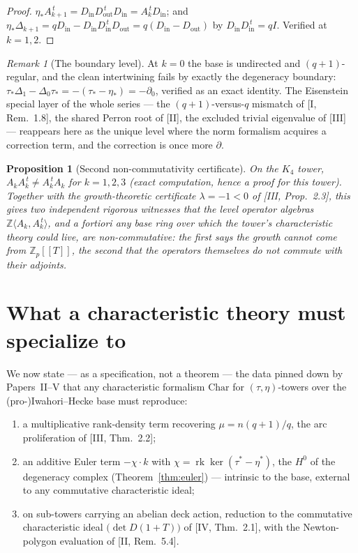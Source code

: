 \documentclass[11pt]{amsart}
\numberwithin{equation}{section}
\newtheorem{proposition}[theorem]{Proposition}
\theoremstyle{definition}
\theoremstyle{remark}
\newtheorem{remark}[theorem]{Remark}
\newcommand{\Z}{\mathbb{Z}}
\newcommand{\Zp}{\Z_p}
\newcommand{\rk}{\operatorname{rk}}
\newcommand{\ta}{\tau_*}
\newcommand{\taup}{\tau^*}
\newcommand{\et}{\eta_*}
\newcommand{\etp}{\eta^*}
\begin{document}
\begin{proof}
$\et A_{k+1}^{\,t}=D_{\mathrm{in}}D_{\mathrm{out}}^{\,t}D_{\mathrm{in}}
=A_k^{\,t}D_{\mathrm{in}}$; and
$\et\Delta_{k+1}=qD_{\mathrm{in}}-D_{\mathrm{in}}D_{\mathrm{in}}^{\,t}D_{\mathrm{out}}
=q(D_{\mathrm{in}}-D_{\mathrm{out}})$ by
$D_{\mathrm{in}}D_{\mathrm{in}}^{\,t}=qI$. Verified at $k=1,2$.
\end{proof}

\begin{remark}[The boundary level]\label{rem:level0}
At $k=0$ the base is undirected and $(q+1)$-regular, and the clean intertwining fails
by exactly the degeneracy boundary:
$\ta\Delta_1-\Delta_0\ta=-(\ta-\et)=-\partial_0$, verified as an exact identity. The
Eisenstein special layer of the whole series --- the $(q+1)$-versus-$q$ mismatch of
[I, Rem.~1.8], the shared Perron root of [II], the excluded trivial eigenvalue of
[III] --- reappears here as the unique level where the norm formalism acquires a
correction term, and the correction is once more $\partial$.
\end{remark}

\begin{proposition}[Second non-commutativity certificate]\label{prop:nonnormal}
On the $K_4$ tower, $A_kA_k^{\,t}\neq A_k^{\,t}A_k$ for $k=1,2,3$ (exact
computation, hence a proof for this tower). Together with the growth-theoretic
certificate $\lambda=-1<0$ of {\rm[III, Prop.~2.3]}, this gives two independent
rigorous witnesses that the level operator algebras
$\Z\langle A_k,A_k^{\,t}\rangle$, and a fortiori any base ring over which the tower's
characteristic theory could live, are non-commutative: the first says the
\emph{growth} cannot come from $\Zp[[T]]$, the second that the \emph{operators}
themselves do not commute with their adjoints.
\end{proposition}

\section{What a characteristic theory must specialize to}\label{sec:axioms}

We now state --- as a specification, not a theorem --- the data pinned down by
Papers~II--V that any characteristic formalism $\mathrm{Char}$ for
$(\tau,\eta)$-towers over the (pro-)Iwahori--Hecke base must reproduce:
\begin{enumerate}
\item[(A1)] a multiplicative rank-density term recovering $\mu=n(q+1)/q$, the arc
proliferation of {\rm[III, Thm.~2.2]};
\item[(A2)] an additive Euler term $-\chi\cdot k$ with
$\chi=\rk\ker(\taup-\etp)$, the $H^0$ of the degeneracy complex
(Theorem~\ref{thm:euler}) --- intrinsic to the base, external to any commutative
characteristic ideal;
\item[(A3)] on sub-towers carrying an abelian deck action, reduction to the
commutative characteristic ideal $\bigl(\det D(1+T)\bigr)$ of {\rm[IV, Thm.~2.1]},
with the Newton-polygon evaluation of {\rm[II, Rem.~5.4]}.
\end{enumerate}
\end{document}
